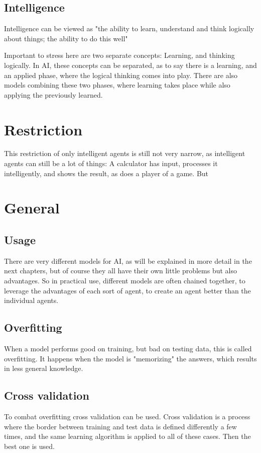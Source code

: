 \subsection{Intelligence}
Intelligence can be viewed as "the ability to learn, understand and think logically about things; the ability to do this well" 

Important to stress here are two separate concepts: Learning, and thinking logically.
In AI, these concepts can be separated, as to say there is a learning, and an applied phase, where the logical thinking comes into play. %
There are also models combining these two phases, where learning takes place while also applying the previously learned. 

\section{Restriction}
This restriction of only intelligent agents is still not very narrow, as intelligent agents can still be a lot of things: A calculator has input, processes it intelligently, and shows the result, as does a player of a game.
But 

\section{General}
\subsection{Usage}
There are very different models for AI, as will be explained in more detail in the next chapters, but of course they all have their own little problems but also advantages. So in practical use, different models are often chained together, to leverage the advantages of each sort of agent, to create an agent better than the individual agents. %
\subsection{Overfitting}
When a model performs good on training, but bad on testing data, this is called overfitting. It happens when the model is "memorizing" the answers, which results in less general knowledge.
\subsection{Cross validation}
To combat overfitting cross validation can be used. Cross validation is a process where the border between training and test data is defined differently a few times, and the same learning algorithm is applied to all of these cases. Then the best one is used.